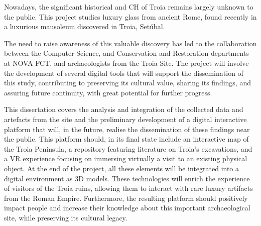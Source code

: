
Nowadays, the significant historical and \gls{CH} of Troia remains largely unknown to the public. This project studies luxury glass from ancient Rome, found recently in a luxurious mausoleum discovered in Troia, Setúbal.  

The need to raise awareness of this valuable discovery has led to the collaboration between the Computer Science, and Conservation and Restoration departments at NOVA FCT, and archaeologists from the Troia Site. The project will involve the development of several digital tools that will support the dissemination of this study, contributing to preserving its cultural value, sharing its findings, and assuring future continuity, with great potential for further progress.  

This dissertation covers the analysis and integration of the collected data and artefacts from the site and the preliminary development of a digital interactive platform that will, in the future, realise the dissemination of these findings near the public. This platform should, in its final state include an interactive map of the Troia Peninsula, a repository featuring literature on Troia’s excavations, and a \gls{VR} experience focusing on immersing virtually a visit to an existing physical object. At the end of the project, all these elements will be integrated into a digital environment as \gls{3D} models. These technologies will enrich the experience of visitors of the Troia ruins, allowing them to interact with rare luxury artifacts from the Roman Empire. Furthermore, the resulting platform should positively impact people and increase their knowledge about this important archaeological site, while preserving its cultural legacy. 



